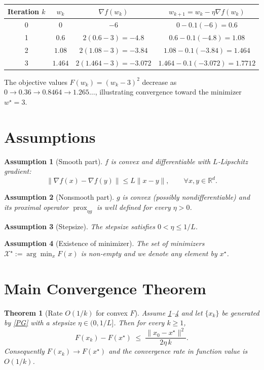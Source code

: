 \documentclass{article}
\newtheorem{theorem}{Theorem}
\newtheorem{assumption}{Assumption}
\newcommand{\prox}{\operatorname{prox}}
\newcommand{\grad}{\nabla}
\begin{document}
\begin{center}
\begin{tabular}{c|c|c|c}
Iteration $k$ & $w_k$ & $\grad f(w_k)$ & $w_{k+1}=w_k-\eta\grad f(w_k)$\\ \hline
0 & $0$ & $-6$ & $0-0.1(-6)=0.6$ \\
1 & $0.6$ & $2(0.6-3)=-4.8$ & $0.6-0.1(-4.8)=1.08$ \\
2 & $1.08$ & $2(1.08-3)=-3.84$ & $1.08-0.1(-3.84)=1.464$ \\
3 & $1.464$ & $2(1.464-3)=-3.072$ & $1.464-0.1(-3.072)=1.7712$
\end{tabular}
\end{center}
The objective values $F(w_k)=(w_k-3)^2$ decrease as $0\to0.36\to0.8464\to1.265\ldots$, illustrating convergence toward the minimizer $w^\star=3$.

\newpage
\section*{Assumptions}
\begin{assumption}[Smooth part]
\label{asmp:smooth}
$f$ is convex and differentiable with $L$‑Lipschitz gradient:
\[
\|\grad f(x)-\grad f(y)\|\le L\|x-y\|,\qquad\forall x,y\in\mathbb{R}^d .
\]
\end{assumption}
\begin{assumption}[Nonsmooth part]
\label{asmp:nonsmooth}
$g$ is convex (possibly nondifferentiable) and its proximal operator $\prox_{\eta g}$ is well defined for every $\eta>0$.
\end{assumption}
\begin{assumption}[Stepsize]
\label{asmp:stepsize}
The stepsize satisfies $0<\eta\le 1/L$.
\end{assumption}
\begin{assumption}[Existence of minimizer]
\label{asmp:opt}
The set of minimizers $\mathcal{X}^\star:=\arg\min_x F(x)$ is non‑empty and we denote any element by $x^\star$.
\end{assumption}

\section*{Main Convergence Theorem}
\begin{theorem}[Rate $O(1/k)$ for convex $F$]
\label{thm:rate}
Assume \ref{asmp:smooth}--\ref{asmp:opt} and let $\{x_k\}$ be generated by \eqref{PG} with a stepsize $\eta\in(0,1/L]$. Then for every $k\ge1$,
\begin{equation}
F(x_k)-F(x^\star)\;\le\;\frac{\|x_0-x^\star\|^2}{2\eta\,k}.
\tag{1}
\end{equation}
Consequently $F(x_k)\to F(x^\star)$ and the convergence rate in function value is $O(1/k)$.
\end{theorem}
\end{document}
